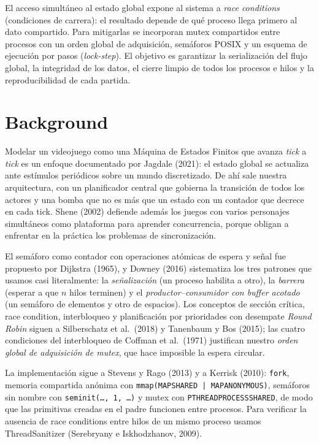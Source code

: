 \documentclass[11pt,a4paper]{article}
\newcommand{\cod}[1]{\texttt{#1}}
\renewcommand{\_}{\textunderscore\allowbreak}
\begin{document}
El acceso simultáneo al estado global expone al sistema a \emph{race conditions} (condiciones de carrera): el resultado depende de qué proceso llega primero al dato compartido. Para mitigarlas se incorporan mutex compartidos entre procesos con un orden global de adquisición, semáforos POSIX y un esquema de ejecución por pasos (\emph{lock-step}). El objetivo es garantizar la serialización del flujo global, la integridad de los datos, el cierre limpio de todos los procesos e hilos y la reproducibilidad de cada partida.

\section{Background}

Modelar un videojuego como una Máquina de Estados Finitos que avanza \emph{tick} a \emph{tick} es un enfoque documentado por Jagdale (2021): el estado global se actualiza ante estímulos periódicos sobre un mundo discretizado. De ahí sale nuestra arquitectura, con un planificador central que gobierna la transición de todos los actores y una bomba que no es más que un estado con un contador que decrece en cada tick. Shene (2002) defiende además los juegos con varios personajes simultáneos como plataforma para aprender concurrencia, porque obligan a enfrentar en la práctica los problemas de sincronización.

El semáforo como contador con operaciones atómicas de espera y señal fue propuesto por Dijkstra (1965), y Downey (2016) sistematiza los tres patrones que usamos casi literalmente: la \emph{señalización} (un proceso habilita a otro), la \emph{barrera} (esperar a que $n$ hilos terminen) y el \emph{productor--consumidor con buffer acotado} (un semáforo de elementos y otro de espacios). Los conceptos de sección crítica, race condition, interbloqueo y planificación por prioridades con desempate \emph{Round Robin} siguen a Silberschatz et al.\ (2018) y Tanenbaum y Bos (2015); las cuatro condiciones del interbloqueo de Coffman et al.\ (1971) justifican nuestro \emph{orden global de adquisición de mutex}, que hace imposible la espera circular.

La implementación sigue a Stevens y Rago (2013) y a Kerrisk (2010): \cod{fork}, memoria compartida anónima con \cod{mmap(MAP\_SHARED | MAP\_ANONYMOUS)}, semáforos sin nombre con \cod{sem\_init(\ldots, 1, \ldots)} y mutex con \cod{PTHREAD\_PROCESS\_SHARED}, de modo que las primitivas creadas en el padre funcionen entre procesos. Para verificar la ausencia de race conditions entre hilos de un mismo proceso usamos ThreadSanitizer (Serebryany e Iskhodzhanov, 2009).
\end{document}
